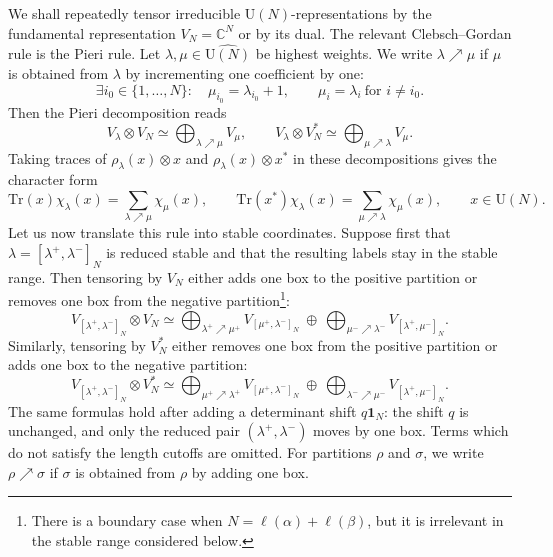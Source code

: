 \documentclass[11pt,a4paper,reqno]{amsart}
\theoremstyle{definition}
\theoremstyle{remark}
\newcommand\U{{\mathrm U}}
\newcommand\C{{\mathbb C}}
\newcommand\Tr{{\mathrm{Tr}}}
\begin{document}
We shall repeatedly tensor irreducible $\U(N)$-representations by the fundamental representation $V_N=\C^N$ or by its dual. The relevant Clebsch--Gordan rule is the Pieri rule. Let $\lambda,\mu\in\widehat{\U(N)}$ be highest weights. We write $\lambda\nearrow \mu$ if $\mu$ is obtained from $\lambda$ by incrementing one coefficient by one:
\[
\exists i_0\in\{1,\ldots,N\}:\quad \mu_{i_0}=\lambda_{i_0}+1,\qquad \mu_i=\lambda_i\ \text{for }i\neq i_0 .
\]
Then the Pieri decomposition reads
\begin{equation}\label{eq:Pieri}
V_\lambda\otimes V_N \simeq\bigoplus_{\lambda\nearrow\mu} V_\mu,\qquad V_\lambda\otimes V_N^*\simeq\bigoplus_{\mu\nearrow\lambda} V_\mu .
\end{equation}
Taking traces of
$\rho_\lambda(x)\otimes x$ and
$\rho_\lambda(x)\otimes x^*$ in these decompositions gives the character
form
\begin{equation}\label{eq:Pieri-trace}
\Tr(x)\chi_\lambda(x)=\sum_{\lambda\nearrow\mu}\chi_\mu(x),\qquad\Tr(x^*)\chi_\lambda(x)=\sum_{\mu\nearrow\lambda}\chi_\mu(x),\qquad x\in \U(N).
\end{equation}
Let us now translate this rule into stable coordinates. Suppose first that $\lambda=[\lambda^+,\lambda^-]_N$ is reduced stable and that the resulting labels stay in the stable range. Then tensoring by $V_N$ either adds one box to the positive partition or removes one box from the negative partition\footnote{There is a boundary case when $N=\ell(\alpha)+\ell(\beta)$, but it is irrelevant in the stable range considered below.}:
\begin{equation}\label{eq:Pieri-stable}
V_{[\lambda^+,\lambda^-]_N}\otimes V_N\simeq\bigoplus_{\lambda^+\nearrow\mu^+}V_{[\mu^+,\lambda^-]_N}\ \oplus\ \bigoplus_{\mu^-\nearrow\lambda^-} V_{[\lambda^+,\mu^-]_N}.
\end{equation}
Similarly, tensoring by $V_N^*$ either removes one box from the positive partition or adds one box to the negative partition:
\begin{equation}\label{eq:Pieri-stable2}
V_{[\lambda^+,\lambda^-]_N}\otimes V_N^*\simeq\bigoplus_{\mu^+\nearrow\lambda^+}V_{[\mu^+,\lambda^-]_N}\ \oplus\ \bigoplus_{\lambda^-\nearrow\mu^-}V_{[\lambda^+,\mu^-]_N}.
\end{equation}
The same formulas hold after adding a determinant shift $q\mathbf 1_N$: the shift $q$ is unchanged, and only the reduced pair $(\lambda^+,\lambda^-)$ moves by one box. Terms which do not satisfy the length cutoffs are omitted. For partitions $\rho$ and $\sigma$, we write $\rho\nearrow\sigma$ if $\sigma$ is obtained from $\rho$ by adding one box.
\end{document}
